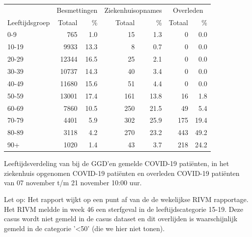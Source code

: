\documentclass[
  english,
  man,floatsintext]{apa6}
\begin{document}
\begin{table}[H]
\centering\begingroup\fontsize{11}{13}\selectfont

\begin{threeparttable}
\begin{tabular}{lrrrrrr}
\toprule
\multicolumn{1}{c}{ } & \multicolumn{2}{c}{Besmettingen} & \multicolumn{2}{c}{Ziekenhuisopnames} & \multicolumn{2}{c}{Overleden} \\
\cmidrule(l{3pt}r{3pt}){2-3} \cmidrule(l{3pt}r{3pt}){4-5} \cmidrule(l{3pt}r{3pt}){6-7}
Leeftijdsgroep & Totaal & \% & Totaal & \% & Totaal & \%\\
\midrule
0-9 & 765 & 1.0 & 15 & 1.3 & 0 & 0.0\\
10-19 & 9933 & 13.3 & 8 & 0.7 & 0 & 0.0\\
20-29 & 12344 & 16.5 & 25 & 2.1 & 0 & 0.0\\
30-39 & 10737 & 14.3 & 40 & 3.4 & 0 & 0.0\\
40-49 & 11680 & 15.6 & 51 & 4.4 & 0 & 0.0\\
50-59 & 13001 & 17.4 & 161 & 13.8 & 16 & 1.8\\
60-69 & 7860 & 10.5 & 250 & 21.5 & 49 & 5.4\\
70-79 & 4401 & 5.9 & 302 & 25.9 & 175 & 19.4\\
80-89 & 3118 & 4.2 & 270 & 23.2 & 443 & 49.2\\
90+ & 1020 & 1.4 & 43 & 3.7 & 218 & 24.2\\
\bottomrule
\end{tabular}
\begin{tablenotes}
\item[1] Leeftijdsverdeling van bij de GGD’en gemelde COVID-19 patiënten, in het ziekenhuis opgenomen COVID-19 patiënten en overleden COVID-19 patiënten van 07 november t/m 21 november 10:00 uur.
\item[2] Let op: Het rapport wijkt op een punt af van de de wekelijkse RIVM rapportage. Het RIVM meldde in week 46 een sterfgeval in de leeftijdscategorie 15-19. Deze casus wordt niet gemeld in de casus dataset en dit overlijden is waarschijnlijk gemeld in de categorie '<50' (die we hier niet tonen).
\end{tablenotes}
\end{threeparttable}
\endgroup{}
\end{table}

\newpage
\end{document}
